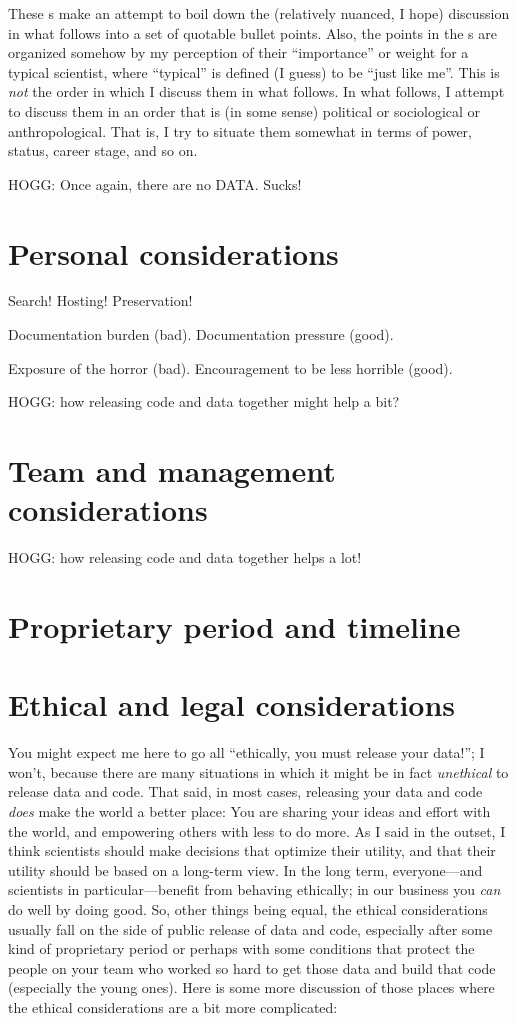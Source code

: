 \documentclass[12pt,twoside,pdftex]{article}
\begin{document}
These \tablename s make an attempt to boil down the (relatively nuanced, I
hope) discussion in what follows into a set of quotable bullet points.
Also, the points in the \tablename s are organized somehow by my
perception of their ``importance'' or weight for a typical scientist,
where ``typical'' is defined (I guess) to be ``just like me''.
This is \emph{not} the order in which I discuss them in what follows.
In what follows, I attempt to discuss them in an order that is (in
some sense) political or sociological or anthropological.
That is, I try to situate them somewhat in terms of power, status,
career stage, and so on.

HOGG: Once again, there are no DATA. Sucks!

\section{Personal considerations}

Search! Hosting! Preservation!

Documentation burden (bad). Documentation pressure (good).

Exposure of the horror (bad). Encouragement to be less horrible (good).

HOGG: how releasing code and data together might help a bit?

\section{Team and management considerations}

HOGG: how releasing code and data together helps a lot!

\section{Proprietary period and timeline}

\section{Ethical and legal considerations}

You might expect me here to go all ``ethically, you must release your
data!''; I won't, because there are many situations in which it might
be in fact \emph{unethical} to release data and code.
That said, in most cases, releasing your data and code \emph{does}
make the world a better place: You are sharing your ideas and effort
with the world, and empowering others with less to do more.
As I said in the outset, I think scientists should make decisions that
optimize their utility, and that their utility should be based on a
long-term view.
In the long term, everyone---and scientists in particular---benefit
from behaving ethically; in our business you \emph{can} do well by
doing good.
So, other things being equal, the ethical considerations usually fall
on the side of public release of data and code, especially after some
kind of proprietary period or perhaps with some conditions that
protect the people on your team who worked so hard to get those data
and build that code (especially the young ones).
Here is some more discussion of those places where the ethical
considerations are a bit more complicated:
\end{document}
